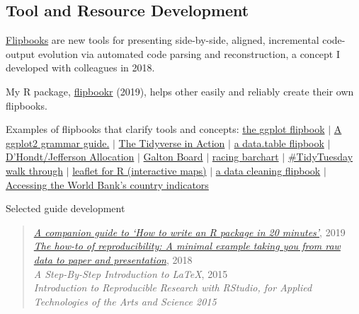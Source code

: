 \documentclass[margin, 10pt]{CVStyleTemplate}\usepackage[]{graphicx}\usepackage[]{color}
\begin{document}
\begin{resume}
\section{Tool and Resource Development}

\href{https://evamaerey.github.io/little_flipbooks_library/about/what_the_flipbook}{Flipbooks} are new tools for presenting side-by-side, aligned, incremental code-output evolution via automated code parsing and reconstruction, a concept I developed with colleagues in 2018. 



My R package, \href{https://github.com/EvaMaeRey/flipbookr}{flipbookr} (2019), helps other easily and reliably create their own flipbooks. 

Examples of flipbooks that clarify tools and concepts: \href{https://github.com/EvaMaeRey/ggplot_flipbook}{the ggplot flipbook}
$|$ \href{https://evamaerey.github.io/ggplot2_grammar_guide/ggplot2_grammar_guide}{A ggplot2 grammar guide.}
$|$ \href{https://github.com/EvaMaeRey/tidyverse_in_action}{The Tidyverse in Action}
$|$  \href{https://evamaerey.github.io/little_flipbooks_library/data.table/data.table}{a data.table flipbook}
$|$ \href{https://evamaerey.github.io/little_flipbooks_library/dhondt_jefferson_allocation/dhondt_jefferson_allocation}{D’Hondt/Jefferson Allocation}
$|$ \href{https://evamaerey.github.io/little_flipbooks_library/galton_board/galton_board.html#1}{Galton Board}
$|$ \href{https://evamaerey.github.io/little_flipbooks_library/racing_bars/racing_barcharts.html}{racing barchart}
$|$  \href{https://evamaerey.github.io/tidytuesday_walk_through/tidytuesday_highlights.html}{\#TidyTuesday walk through}
$|$  \href{https://evamaerey.github.io/little_flipbooks_library/leaflet/leaflet#1}{leaflet for R (interactive maps)}
$|$ \href{https://evamaerey.github.io/little_flipbooks_library/data_cleaning/data_cleaning#1}{a data cleaning flipbook}
$|$  \href{https://evamaerey.github.io/little_flipbooks_library/wbstats/wbstats#1}{Accessing the World Bank's country indicators}



Selected guide development

\begin{quotation}\noindent
\emph{\href{https://evamaerey.github.io/package_in_20_minutes/package_in_20_minutes}{A companion guide to `How to write an R package in 20 minutes'}}, 2019 \\[6pt]
\emph{\href{https://github.com/EvaMaeRey/from_raw_data_to_paper_and_presentation}{The how-to of reproducibility: A minimal example taking you from raw data to paper and presentation}}, 2018 \\[6pt]
\emph{A Step-By-Step Introduction to \LaTeX}, 2015\\[6pt]%
\emph{Introduction to Reproducible Research with RStudio, for Applied Technologies of the Arts and Science 2015}%
\end{quotation}
% 


\end{resume}
\end{document}
